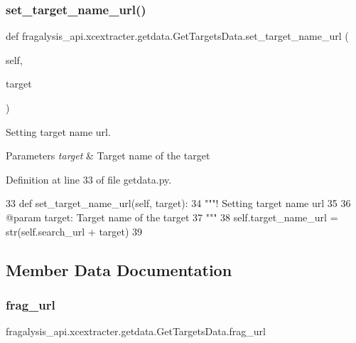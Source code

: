 \subsubsection{\texorpdfstring{set\+\_\+target\+\_\+name\+\_\+url()}{set\_target\_name\_url()}}
{\footnotesize\ttfamily def fragalysis\+\_\+api.\+xcextracter.\+getdata.\+Get\+Targets\+Data.\+set\+\_\+target\+\_\+name\+\_\+url (\begin{DoxyParamCaption}\item[{}]{self,  }\item[{}]{target }\end{DoxyParamCaption})}



Setting target name url. 


\begin{DoxyParams}{Parameters}
{\em target} & Target name of the target \\
\hline
\end{DoxyParams}


Definition at line 33 of file getdata.\+py.


\begin{DoxyCode}
33     \textcolor{keyword}{def }set\_target\_name\_url(self, target):
34         \textcolor{stringliteral}{"""! Setting target name url}
35 \textcolor{stringliteral}{}
36 \textcolor{stringliteral}{        @param target: Target name of the target}
37 \textcolor{stringliteral}{        """}
38         self.target\_name\_url = str(self.search\_url + target)
39 
\end{DoxyCode}


\subsection{Member Data Documentation}
\mbox{\label{classfragalysis__api_1_1xcextracter_1_1getdata_1_1_get_targets_data_afa8f34da2572edae8988c21829ce9c3e}} 
\subsubsection{\texorpdfstring{frag\+\_\+url}{frag\_url}}
{\footnotesize\ttfamily fragalysis\+\_\+api.\+xcextracter.\+getdata.\+Get\+Targets\+Data.\+frag\+\_\+url}



